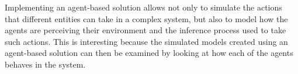 Implementing an agent-based solution allows not only to simulate the actions
that different entities can take in a complex system, but also to model how the
agents are perceiving their environment and the inference process used to take
such actions. This is interesting because the simulated models created using an
agent-based solution can then be examined by looking at how each of the agents
behaves in the system.



